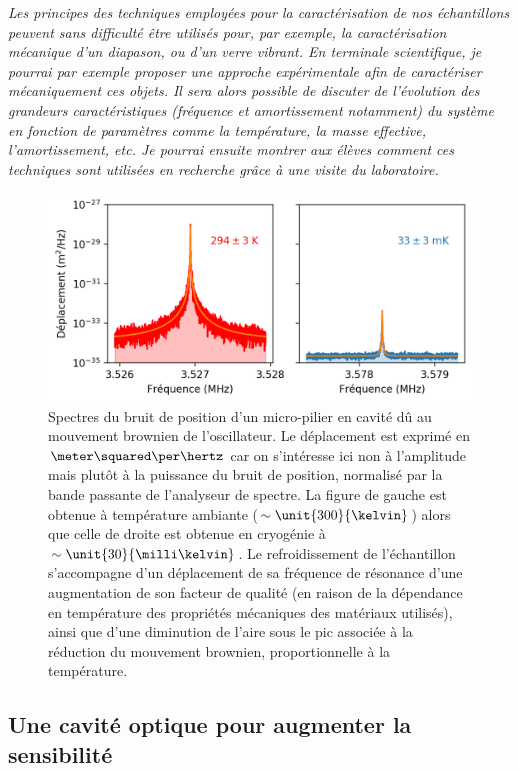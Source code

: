 \documentclass[12pt,a4paper]{article}
\begin{document}
\emph{Les principes des techniques employées pour la caractérisation de nos échantillons peuvent sans difficulté être utilisés pour, par exemple, la caractérisation mécanique d'un diapason, ou d'un verre vibrant.
En terminale scientifique, je pourrai par exemple proposer une approche expérimentale afin de caractériser mécaniquement ces objets.
Il sera alors possible de discuter de l'évolution des grandeurs caractéristiques (fréquence et amortissement notamment) du système en fonction de paramètres comme la température, la masse effective, l'amortissement, etc.
Je pourrai ensuite montrer aux élèves comment ces techniques sont utilisées en recherche grâce à une visite du laboratoire.}
\begin{figure}
\center
\includegraphics[scale=0.75]{figures/thermal_peak_def_filled.png}
\caption{Spectres du bruit de position d'un micro-pilier en cavité dû au mouvement brownien de l'oscillateur.
Le déplacement est exprimé en $\meter\squared\per\hertz$ car on s'intéresse ici non à l'amplitude mais plutôt à la puissance du bruit de position, normalisé par la bande passante de l'analyseur de spectre.
La figure de gauche est obtenue à température ambiante ($\sim\unit{300}{\kelvin}$) alors que celle de droite est obtenue en cryogénie à $\sim\unit{30}{\milli\kelvin}$.
Le refroidissement de l'échantillon s'accompagne d'un déplacement de sa fréquence de résonance d'une augmentation de son facteur de qualité (en raison de la dépendance en température des propriétés mécaniques des matériaux utilisés), ainsi que d'une diminution de l'aire sous le pic associée à la réduction du mouvement brownien, proportionnelle à la température.}
\label{fig:thermal_noise}
\end{figure}

\subsection{Une cavité optique pour augmenter la sensibilité}
\end{document}
